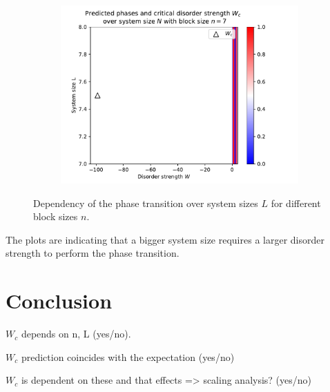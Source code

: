 \documentclass[reprint,amsmath,amssymb,aps,prb]{revtex4-2}
\begin{document}
\begin{center}
\begin{figure}[H]
\begin{subfigure}[c]{0.4\textwidth}
			\includegraphics[width=\textwidth]{../results/Wc/n7_Wc_N_dependency.pdf}
		\end{subfigure}
		\caption{Dependency of the phase transition over system sizes $L$ for different block sizes $n$.}
		\label{fig:wcextract}
	\end{figure}
\end{center}
\twocolumngrid%



The plots are indicating that a bigger system size requires a larger disorder strength to perform the phase transition.


\section{Conclusion}%

$W_c$ depends on n, L (yes/no).

$W_c$ prediction coincides with the expectation (yes/no)

$W_c$ is dependent on these and that effects => scaling analysis? (yes/no)



\newpage
\appendix
\end{document}
